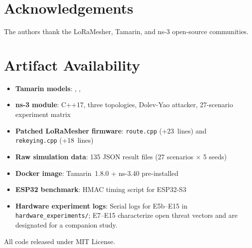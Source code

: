 \documentclass[preprint,12pt]{elsarticle}
\begin{document}
\section*{Acknowledgements}
The authors thank the LoRaMesher, Tamarin, and ns-3 open-source
communities.

\appendix
\section{Artifact Availability}
\label{app:artifact}

{\sloppy
\begin{itemize}
  \item \textbf{Tamarin models}:
    ,
    ,
  \item \textbf{ns-3 module}: C++17, three topologies,
    Dolev-Yao attacker, 27-scenario experiment matrix
  \item \textbf{Patched LoRaMesher firmware}:
    \texttt{route.cpp} (+23~lines) and
    \texttt{rekeying.cpp} (+18~lines)
  \item \textbf{Raw simulation data}: 135 JSON result files
    (27 scenarios $\times$ 5 seeds)
  \item \textbf{Docker image}: Tamarin~1.8.0 + ns-3.40 pre-installed
  \item \textbf{ESP32 benchmark}: HMAC timing script for ESP32-S3
  \item \textbf{Hardware experiment logs}: Serial logs for
    E5b--E15 in \texttt{hardware\_experiments/};
    E7--E15 characterize open threat vectors and are
    designated for a companion study.
\end{itemize}
}

All code released under MIT License.



\end{document}
